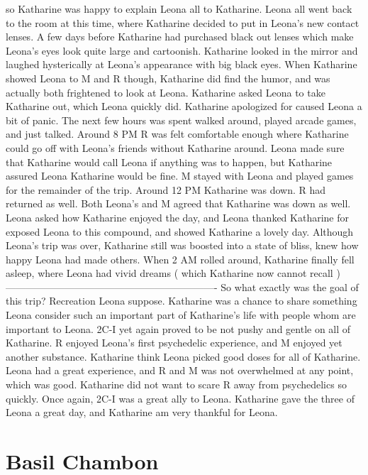 \documentclass[12pt]{book}
\begin{document}
so Katharine was happy to explain Leona all to Katharine. Leona all went back to the room at this time, where Katharine decided to put in Leona's new contact lenses. A few days before Katharine had purchased black out lenses which make Leona's eyes look quite large and cartoonish. Katharine looked in the mirror and laughed hysterically at Leona's appearance with big black eyes. When Katharine showed Leona to M and R though, Katharine did find the humor, and was actually both frightened to look at Leona. Katharine asked Leona to take Katharine out, which Leona quickly did. Katharine apologized for caused Leona a bit of panic. The next few hours was spent walked around, played arcade games, and just talked. Around 8 PM R was felt comfortable enough where Katharine could go off with Leona's friends without Katharine around. Leona made sure that Katharine would call Leona if anything was to happen, but Katharine assured Leona Katharine would be fine. M stayed with Leona and played games for the remainder of the trip. Around 12 PM Katharine was down. R had returned as well. Both Leona's and M agreed that Katharine was down as well. Leona asked how Katharine enjoyed the day, and Leona thanked Katharine for exposed Leona to this compound, and showed Katharine a lovely day. Although Leona's trip was over, Katharine still was boosted into a state of bliss, knew how happy Leona had made others. When 2 AM rolled around, Katharine finally fell asleep, where Leona had vivid dreams ( which Katharine now cannot recall ) ---------------------------------------------------------------- So what exactly was the goal of this trip? Recreation Leona suppose. Katharine was a chance to share something Leona consider such an important part of Katharine's life with people whom are important to Leona. 2C-I yet again proved to be not pushy and gentle on all of Katharine. R enjoyed Leona's first psychedelic experience, and M enjoyed yet another substance. Katharine think Leona picked good doses for all of Katharine. Leona had a great experience, and R and M was not overwhelmed at any point, which was good. Katharine did not want to scare R away from psychedelics so quickly. Once again, 2C-I was a great ally to Leona. Katharine gave the three of Leona a great day, and Katharine am very thankful for Leona.



\chapter{Basil Chambon}
\end{document}
